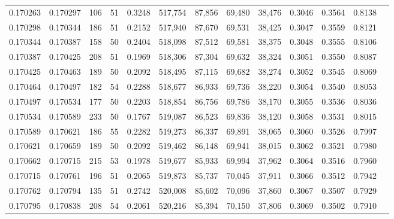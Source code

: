 \begin{tabular}{rrrrrrrrrrrrr}
0.170263 & 0.170297 &   106 &  51 &                                     0.3248 & 517,754 &  87,856 &  69,480 &  38,476 & 0.3046 & 0.3564 & 0.8138 \\
0.170298 & 0.170344 &   186 &  51 &                                     0.2152 & 517,940 &  87,670 &  69,531 &  38,425 & 0.3047 & 0.3559 & 0.8121 \\
0.170344 & 0.170387 &   158 &  50 &                                     0.2404 & 518,098 &  87,512 &  69,581 &  38,375 & 0.3048 & 0.3555 & 0.8106 \\
0.170387 & 0.170425 &   208 &  51 &                                     0.1969 & 518,306 &  87,304 &  69,632 &  38,324 & 0.3051 & 0.3550 & 0.8087 \\
0.170425 & 0.170463 &   189 &  50 &                                     0.2092 & 518,495 &  87,115 &  69,682 &  38,274 & 0.3052 & 0.3545 & 0.8069 \\
0.170464 & 0.170497 &   182 &  54 &                                     0.2288 & 518,677 &  86,933 &  69,736 &  38,220 & 0.3054 & 0.3540 & 0.8053 \\
0.170497 & 0.170534 &   177 &  50 &                                     0.2203 & 518,854 &  86,756 &  69,786 &  38,170 & 0.3055 & 0.3536 & 0.8036 \\
0.170534 & 0.170589 &   233 &  50 &                                     0.1767 & 519,087 &  86,523 &  69,836 &  38,120 & 0.3058 & 0.3531 & 0.8015 \\
0.170589 & 0.170621 &   186 &  55 &                                     0.2282 & 519,273 &  86,337 &  69,891 &  38,065 & 0.3060 & 0.3526 & 0.7997 \\
0.170621 & 0.170659 &   189 &  50 &                                     0.2092 & 519,462 &  86,148 &  69,941 &  38,015 & 0.3062 & 0.3521 & 0.7980 \\
0.170662 & 0.170715 &   215 &  53 &                                     0.1978 & 519,677 &  85,933 &  69,994 &  37,962 & 0.3064 & 0.3516 & 0.7960 \\
0.170715 & 0.170761 &   196 &  51 &                                     0.2065 & 519,873 &  85,737 &  70,045 &  37,911 & 0.3066 & 0.3512 & 0.7942 \\
0.170762 & 0.170794 &   135 &  51 &                                     0.2742 & 520,008 &  85,602 &  70,096 &  37,860 & 0.3067 & 0.3507 & 0.7929 \\
0.170795 & 0.170838 &   208 &  54 &                                     0.2061 & 520,216 &  85,394 &  70,150 &  37,806 & 0.3069 & 0.3502 & 0.7910 \\

\end{tabular}
